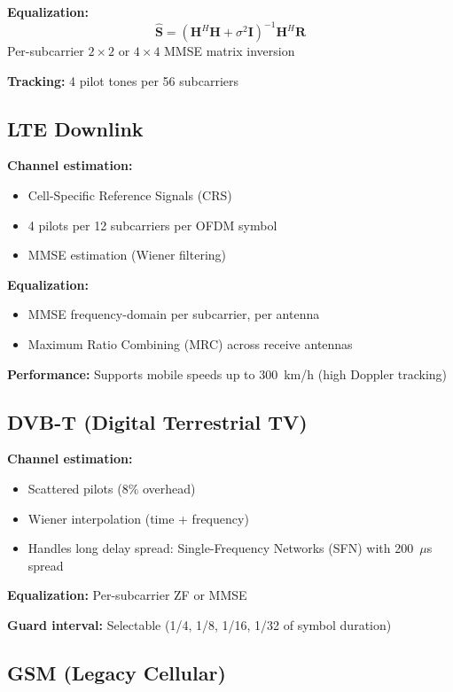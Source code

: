 \textbf{Equalization:}
\begin{equation}
\hat{\mathbf{S}} = (\mathbf{H}^H \mathbf{H} + \sigma^2 \mathbf{I})^{-1} \mathbf{H}^H \mathbf{R}
\end{equation}
Per-subcarrier $2\times2$ or $4\times4$ MMSE matrix inversion

\textbf{Tracking:} 4 pilot tones per 56 subcarriers

\subsection{LTE Downlink}

\textbf{Channel estimation:}
\begin{itemize}
\item Cell-Specific Reference Signals (CRS)
\item 4 pilots per 12 subcarriers per OFDM symbol
\item MMSE estimation (Wiener filtering)
\end{itemize}

\textbf{Equalization:}
\begin{itemize}
\item MMSE frequency-domain per subcarrier, per antenna
\item Maximum Ratio Combining (MRC) across receive antennas
\end{itemize}

\textbf{Performance:} Supports mobile speeds up to 300~km/h (high Doppler tracking)

\subsection{DVB-T (Digital Terrestrial TV)}

\textbf{Channel estimation:}
\begin{itemize}
\item Scattered pilots (8\% overhead)
\item Wiener interpolation (time + frequency)
\item Handles long delay spread: Single-Frequency Networks (SFN) with 200~$\mu$s spread
\end{itemize}

\textbf{Equalization:} Per-subcarrier ZF or MMSE

\textbf{Guard interval:} Selectable (1/4, 1/8, 1/16, 1/32 of symbol duration)

\subsection{GSM (Legacy Cellular)}


